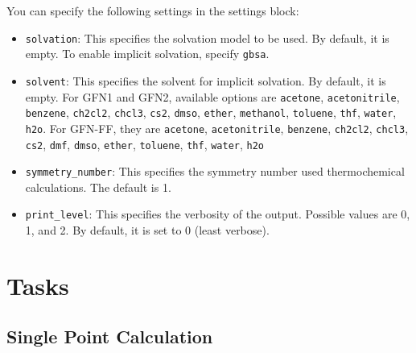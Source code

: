 \documentclass[]{tufte-book}
\begin{document}
You can specify the following settings in the settings block:
\begin{itemize}
\item \texttt{solvation}: This specifies the solvation model to be used. By default, it is empty. To enable implicit solvation, specify \texttt{gbsa}.
\item \texttt{solvent}: This specifies the solvent for implicit solvation. By default, it is empty. For GFN1 and GFN2, available options are \texttt{acetone}, \texttt{acetonitrile},
\texttt{benzene}, \texttt{ch2cl2}, \texttt{chcl3}, \texttt{cs2}, \texttt{dmso}, \texttt{ether}, \texttt{methanol}, \texttt{toluene}, \texttt{thf}, \texttt{water}, \texttt{h2o}. For
GFN-FF, they are \texttt{acetone}, \texttt{acetonitrile}, \texttt{benzene}, \texttt{ch2cl2}, \texttt{chcl3}, \texttt{cs2}, \texttt{dmf}, \texttt{dmso}, \texttt{ether}, \texttt{toluene},
\texttt{thf}, \texttt{water}, \texttt{h2o}
\item \texttt{symmetry\_number}: This specifies the symmetry number used thermochemical calculations. The default is 1.
\item \texttt{print\_level}: This specifies the verbosity of the output. Possible values are 0, 1, and 2. By default, it is set to 0 (least verbose).
\end{itemize}


\section{Tasks}

\subsection{Single Point Calculation}
\end{document}
